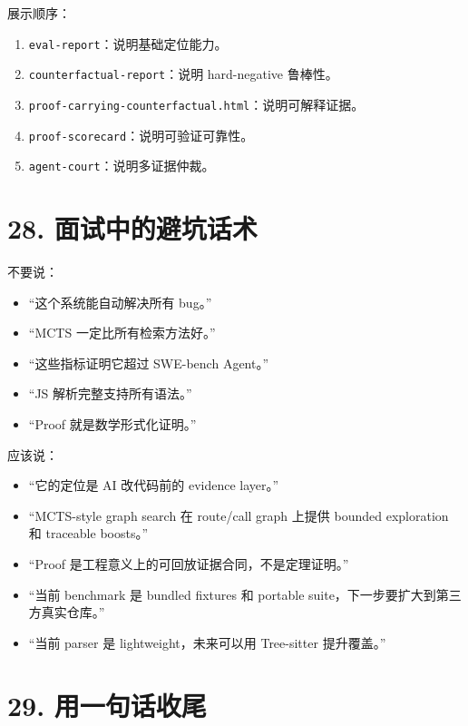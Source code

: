 \documentclass[UTF8,12pt,openany]{ctexbook}
\begin{document}
展示顺序：\par

\begin{enumerate}
\item \texttt{eval-report}：说明基础定位能力。
\item \texttt{counterfactual-report}：说明 hard-negative 鲁棒性。
\item \texttt{proof-carrying-counterfactual.html}：说明可解释证据。
\item \texttt{proof-scorecard}：说明可验证可靠性。
\item \texttt{agent-court}：说明多证据仲裁。
\end{enumerate}

\section{28. 面试中的避坑话术}

不要说：\par

\begin{itemize}
\item “这个系统能自动解决所有 bug。”
\item “MCTS 一定比所有检索方法好。”
\item “这些指标证明它超过 SWE-bench Agent。”
\item “JS 解析完整支持所有语法。”
\item “Proof 就是数学形式化证明。”
\end{itemize}

应该说：\par

\begin{itemize}
\item “它的定位是 AI 改代码前的 evidence layer。”
\item “MCTS-style graph search 在 route/call graph 上提供 bounded exploration 和 traceable boosts。”
\item “Proof 是工程意义上的可回放证据合同，不是定理证明。”
\item “当前 benchmark 是 bundled fixtures 和 portable suite，下一步要扩大到第三方真实仓库。”
\item “当前 parser 是 lightweight，未来可以用 Tree-sitter 提升覆盖。”
\end{itemize}

\section{29. 用一句话收尾}
\end{document}
